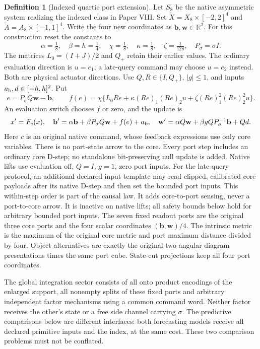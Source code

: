 \documentclass[11pt,a4paper]{article}
\theoremstyle{definition}
\newtheorem{definition}[theorem]{Definition}
\begin{document}
\begin{definition}[Indexed quartic port extension]
\label{def:bridge-indexed-quartic-plant}
Let $S_8$ be the native asymmetric system realizing the indexed class in
Paper VIII. Set $\widetilde X=X_8\times[-2,2]^4$ and
$\widetilde A=A_8\times[-1,1]^4$. Write the four new coordinates as
$\mathbf b,\mathbf w\in\mathbb R^2$. For this construction reset the constants to
\[
 \alpha=\tfrac18,\quad\beta=h=\tfrac14,\quad\chi=\tfrac18,
 \quad\kappa=\tfrac18,\quad\zeta=\tfrac1{128},\quad P_\sigma=\sigma I.
\]
The matrices $L_0=(I+J)/2$ and $Q_+$ retain their earlier values.
The ordinary evaluation direction is $u=e_1$; a late-query command may
choose $u=e_2$ instead. Both are physical actuator directions. Use $Q,R\in\{I,Q_+\}$, $|g|\le1$, and inputs
$a_{\rm b},d\in[-h,h]^2$. Put
\[
 e=P_\sigma Q\mathbf w-\mathbf b,\qquad
 f(e)=\chi\{L_0Re+\kappa(Re)_1(Re)_2u
                    +\zeta(Re)_1^2(Re)_2^2u\}.
\]
An evaluation switch chooses $f$ or zero, and the update is
\[
 x'=F_c(x),\quad
 \mathbf b'=\alpha\mathbf b+\beta P_\sigma Q\mathbf w+f(e)+a_{\rm b},
 \quad
 \mathbf w'=\alpha Q\mathbf w+\beta g QP_\sigma^{-1}\mathbf b+Qd.
\]
Here $c$ is an original native command, whose feedback expressions use only
core variables. There is no port-state arrow to the core. Every port step
includes an ordinary core D-step; no standalone bit-preserving null update
is added. Native lifts use evaluation off, $Q=I$, $g=1$, zero port inputs.
For the late-query protocol, an additional declared input template may read
clipped, calibrated core payloads after its native D-step and then set the
bounded port inputs. This within-step order is part of the causal law. It
adds core-to-port sensing, never a port-to-core arrow. It is inactive on
native lifts; all safety bounds below hold for arbitrary bounded port inputs.
The seven fixed readout ports are the original three core ports and the four
scalar coordinates $(\mathbf b,\mathbf w)/4$. The intrinsic metric is the
maximum of the original core metric and port maximum distance divided by four.
Object alternatives are exactly the original two angular diagram presentations
times the same port cube. State-cut projections keep all four port coordinates.

The global integration sector consists of all onto product encodings of the
enlarged support, all nonempty splits of these fixed ports and arbitrary
independent factor mechanisms using a common command word. Neither factor
receives the other's state or a free side channel carrying $\sigma$.
The predictive comparisons below are different interfaces: both forecasting
models receive all declared primitive inputs and the index, at the same cost.
These two comparison problems must not be conflated.
\end{definition}
\end{document}
